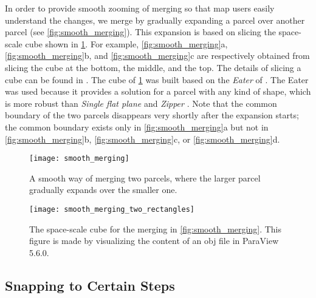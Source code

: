 \documentclass[ijgi,article,submit,moreauthors,pdftex]{Definitions/mdpi}
\begin{document}
In order to provide smooth zooming of merging
so that map users easily understand the changes,
we merge by gradually expanding a parcel over another parcel
(see \fig\ref{fig:smooth_merging}).
This expansion is based on slicing the space-scale cube shown in
\fig\ref{fig:smooth_merging_two_rectangles}.
For example, \figs\ref{fig:smooth_merging}a,
\ref{fig:smooth_merging}b, and \ref{fig:smooth_merging}c
are respectively obtained from slicing the cube 
at the bottom, the middle, and the top.
The details of slicing a cube can be found in \citet{Meijers2020Web}.
The cube of \fig\ref{fig:smooth_merging_two_rectangles} was built 
based on the \emph{Eater} of \citet{Suba2014Merge}.
The Eater was used because it provides a solution 
for a parcel with any kind of shape, which is more robust than
\emph{Single flat plane} and \emph{Zipper} \citep{Suba2014Merge}.
Note that the common boundary of the two parcels disappears
very shortly after the expansion starts;
the common boundary exists only in \fig\ref{fig:smooth_merging}a but not in
\fig\ref{fig:smooth_merging}b,
\fig\ref{fig:smooth_merging}c, or
\fig\ref{fig:smooth_merging}d.


\begin{figure}[tb]
\centering
\texttt{[image: smooth\_merging]}
\caption{A smooth way of merging two parcels,
    where the larger parcel gradually expands over the smaller one.}
\label{fig:smooth_merging}
%
\vspace{6mm}
%
\centering
\texttt{[image: smooth\_merging\_two\_rectangles]}
\caption{The space-scale cube for the merging 
    in \fig\ref{fig:smooth_merging}.
    This figure is made by visualizing the content of an obj file in 
    ParaView 5.6.0.}
\label{fig:smooth_merging_two_rectangles}
\end{figure}




\subsection{Snapping to Certain Steps}
\label{sec:snap}
\end{document}
